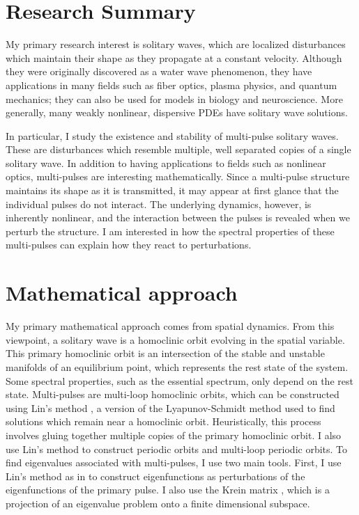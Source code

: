 \documentclass[12pt,reqno,oneside]{amsart}
\theoremstyle{definition}
\theoremstyle{remark}
\begin{document}
\thispagestyle{empty}

\section{Research Summary}

My primary research interest is solitary waves, which are localized disturbances which maintain their shape as they propagate at a constant velocity. Although they were originally discovered as a water wave phenomenon, they have applications in many fields such as fiber optics, plasma physics, and quantum mechanics; they can also be used for models in biology and neuroscience. More generally, many weakly nonlinear, dispersive PDEs have solitary wave solutions.

In particular, I study the existence and stability of multi-pulse solitary waves. These are disturbances which resemble multiple, well separated copies of a single solitary wave. In addition to having applications to fields such as nonlinear optics, multi-pulses are interesting mathematically. Since a multi-pulse structure maintains its shape as it is transmitted, it may appear at first glance that the individual pulses do not interact. The underlying dynamics, however, is inherently nonlinear, and the interaction between the pulses is revealed when we perturb the structure. I am interested in how the spectral properties of these multi-pulses can explain how they react to perturbations.

\section{Mathematical approach}

My primary mathematical approach comes from spatial dynamics. From this viewpoint, a solitary wave is a homoclinic orbit evolving in the spatial variable. This primary homoclinic orbit is an intersection of the stable and unstable manifolds of an equilibrium point, which represents the rest state of the system. Some spectral properties, such as the essential spectrum, only depend on the rest state. Multi-pulses are multi-loop homoclinic orbits, which can be constructed using Lin's method \cite{Lin2008}, a version of the Lyapunov-Schmidt method used to find solutions which remain near a homoclinic orbit. Heuristically, this process involves gluing together multiple copies of the primary homoclinic orbit. I also use Lin's method to construct periodic orbits and multi-loop periodic orbits. To find eigenvalues associated with multi-pulses, I use two main tools. First, I use Lin's method as in \cite{Sandstede1998} to construct eigenfunctions as perturbations of the eigenfunctions of the primary pulse. I also use the Krein matrix \cite{Kapitula2013a,Kap2019}, which is a projection of an eigenvalue problem onto a finite dimensional subspace.
\end{document}
